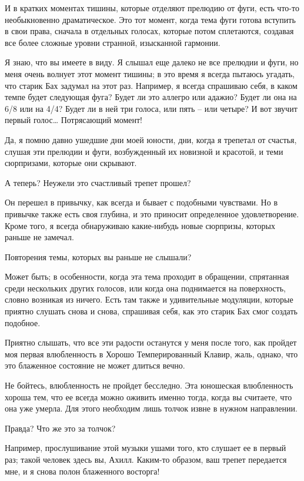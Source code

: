 \documentclass[../main.tex]{subfiles}
\begin{document}
\begin{dialogue}
 И в кратких моментах тишины, которые отделяют прелюдию от фуги, есть что-то необыкновенно драматическое. Это тот момент, когда тема фуги готова вступить в свои права, сначала в отдельных голосах, которые потом сплетаются, создавая все более сложные уровни странной, изысканной гармонии.

 Я знаю, что вы имеете в виду. Я слышал еще далеко не все прелюдии и фуги, но меня очень волнует этот момент тишины; в это время я всегда пытаюсь угадать, что старик Бах задумал на этот раз. Например, я всегда спрашиваю себя, в каком темпе будет следующая фуга? Будет ли это аллегро или адажио? Будет ли она на 6/8 или на 4/4? Будет ли в ней три голоса, или пять \--- или четыре? И вот звучит первый голос\ldots{} Потрясающий момент!

 Да, я помню давно ушедшие дни моей юности, дни, когда я трепетал от счастья, слушая эти прелюдии и фуги, возбужденный их новизной и красотой, и теми сюрпризами, которые они скрывают.

 А теперь? Неужели это счастливый трепет прошел?

 Он перешел в привычку, как всегда и бывает с подобными чувствами. Но в привычке также есть своя глубина, и это приносит определенное удовлетворение. Кроме того, я всегда обнаруживаю какие-нибудь новые сюрпризы, которых раньше не замечал.

 Повторения темы, которых вы раньше не слышали?

 Может быть; в особенности, когда эта тема проходит в обращении, спрятанная среди нескольких других голосов, или когда она поднимается на поверхность, словно возникая из ничего. Есть там также и удивительные модуляции, которые приятно слушать снова и снова, спрашивая себя, как это старик Бах смог создать подобное.

 Приятно слышать, что все эти радости останутся у меня после того, как пройдет моя первая влюбленность в Хорошо Темперированный Клавир, жаль, однако, что это блаженное состояние не может длиться вечно.

 Не бойтесь, влюбленность не пройдет бесследно. Эта юношеская влюбленность хороша тем, что ее всегда можно оживить именно тогда, когда вы считаете, что она уже умерла. Для этого необходим лишь толчок извне в нужном направлении.

 Правда? Что же это за толчок?

 Например, прослушивание этой музыки ушами того, кто слушает ее в первый раз; такой человек здесь вы, Ахилл. Каким-то образом, ваш трепет передается мне, и я снова полон блаженного восторга!


\end{dialogue}
\end{document}
